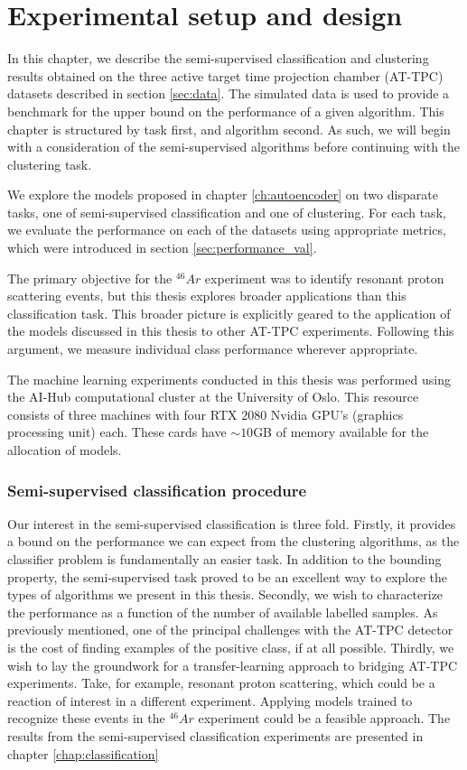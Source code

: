 \chapter{Experimental setup and design}

In this chapter, we describe the semi-supervised classification and clustering results obtained on the three active target time projection chamber (AT-TPC) datasets described in section \ref{sec:data}. The simulated data is used to provide a benchmark for the upper bound on the performance of a given algorithm. This chapter is structured by task first, and algorithm second. As such, we will begin with a consideration of the semi-supervised algorithms before continuing with the clustering task. 

 We explore the models proposed in chapter \ref{ch:autoencoder} on two disparate tasks, one of semi-supervised classification and one of clustering. For each task, we evaluate the performance on each of the datasets using appropriate metrics, which were introduced in section \ref{sec:performance_val}. 

 The primary objective for the ${}^{46}Ar$ experiment was to identify resonant proton scattering events, but this thesis explores broader applications than this classification task. This broader picture is explicitly geared to the application of the models discussed in this thesis to other AT-TPC experiments. Following this argument, we measure individual class performance wherever appropriate. 

The machine learning experiments conducted in this thesis was performed using the AI-Hub computational cluster at the University of Oslo.  This resource consists of three machines with four RTX $2080$ Nvidia GPU's (graphics processing unit) each. These cards have $\sim 10$GB of memory available for the allocation of models.

\subsection{Semi-supervised classification procedure}\label{sec:clf_procedure}

Our interest in the semi-supervised classification is three fold. Firstly, it provides a bound on the performance we can expect from the clustering algorithms, as the classifier problem is fundamentally an easier task. In addition to the bounding property, the semi-supervised task proved to be an excellent way to explore the types of algorithms we present in this thesis. Secondly, we wish to characterize the performance as a function of the number of available labelled samples. As previously mentioned, one of the principal challenges with the AT-TPC detector is the cost of finding examples of the positive class, if at all possible. Thirdly, we wish to lay the groundwork for a transfer-learning approach to bridging AT-TPC experiments. Take, for example, resonant proton scattering, which could be a reaction of interest in a different experiment. Applying models trained to recognize these events in the ${}^{46}Ar$ experiment could be a feasible approach. The results from the semi-supervised classification experiments are presented in chapter \ref{chap:classification}

